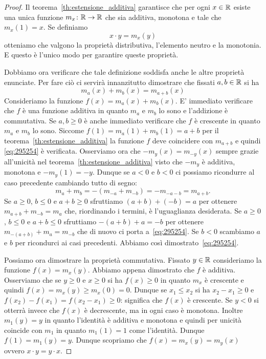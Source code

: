 %
\begin{proof}
Il teorema~\ref{th:estensione_additiva} garantisce che 
per ogni $x\in \mathbb R$ esiste una unica funzione $m_x\colon \mathbb R\to\mathbb R$
che sia additiva, monotona e tale che $m_x(1)=x$.
Se definiamo 
\[
  x\cdot y = m_x(y)  
\]
otteniamo che valgono la proprietà distributiva, l'elemento neutro
e la monotonia. 
E questo è l'unico modo per garantire queste proprietà.

Dobbiamo ora verificare che tale definizione soddisfa anche le altre 
proprietà enunciate. 
Per fare ciò ci servirà innanzitutto dimostrare 
che fissati $a,b\in \mathbb R$ si ha 
\begin{equation}\label{eq:295254}
 m_a(x) + m_b(x) = m_{a+b}(x)  
\end{equation}
Consideriamo la funzione $f(x) = m_a(x) + m_b(x)$.
E' immediato verificare che $f$ è una funzione additiva
in quanto $m_a$ e $m_b$ lo sono e l'addizione è commutativa.
Se $a,b\ge 0$ è anche immediato verificare che $f$ è crescente 
in quanto $m_a$ e $m_b$ lo sono. 
Siccome $f(1) = m_a(1)+m_b(1)=a+b$ per il teorema~\ref{th:estensione_additiva}
la funzione $f$ deve coincidere con $m_{a+b}$ e quindi 
\eqref{eq:295254} è verificata.
Osserviamo ora che $-m_y(x) = m_{-y}(x)$ sempre grazie all'unicità nel 
teorema~\ref{th:estensione_additiva} visto che $-m_y$ è additiva, monotona 
e $-m_y(1)=-y$.
Dunque se $a<0$ e $b<0$ ci possiamo ricondurre al caso precedente 
cambiando tutto di segno:
\[
m_{a}+m_{b} = - (m_{-a}+m_{-b}) = - m_{-a -b} = m_{a+b}. 
\]
Se $a\ge 0$, $b\le 0$ e $a+b\ge 0$ sfruttiamo $(a+b) + (-b) = a$
per ottenere 
$m_{a+b} + m_{-b} = m_a$ che, riordinando i termini, 
è l'uguaglianza desiderata.
Se $a\ge 0$, $b\le 0$ e $a+b\le 0$ sfruttiamo $-(a+b) + a = -b$
per ottenere $m_{-(a+b)} + m_a = m_{-b}$ 
che di nuovo ci porta a~\eqref{eq:295254}.
Se $b<0$ scambiamo $a$ e $b$ per ricondurci ai casi precedenti.
Abbiamo così dimostrato~\eqref{eq:295254}.

Possiamo ora dimostrare la proprietà commutativa.
Fissato $y\in \mathbb R$ consideriamo la funzione $f(x) = m_x(y)$.
Abbiamo appena dimostrato che $f$ è additiva.
Osserviamo che se $y\ge 0$ e $x\ge 0$ si ha $f(x)\ge 0$ 
in quanto $m_x$ è crescente e quindi $f(x)=m_x(y) \ge m_x(0)=0$.
Dunque se $x_1\le x_2$ si ha $x_2-x_1\ge 0$ 
e $f(x_2)-f(x_1) = f(x_2-x_1)\ge 0$: significa 
che $f(x)$ è crescente. Se $y<0$ si otterrà invece che 
$f(x)$ è decrescente, ma in ogni caso è monotona.
Inoltre $m_1(y) = y$ in quanto l'identità è additiva 
e monotona e quindi per unicità coincide con $m_1$ 
in quanto $m_1(1)=1$ come l'identità.
Dunque $f(1) = m_1(y) = y$.
Dunque scopriamo che $f(x) = m_x(y) = m_y(x)$ ovvero 
$x\cdot y = y\cdot x$.


\end{proof}
